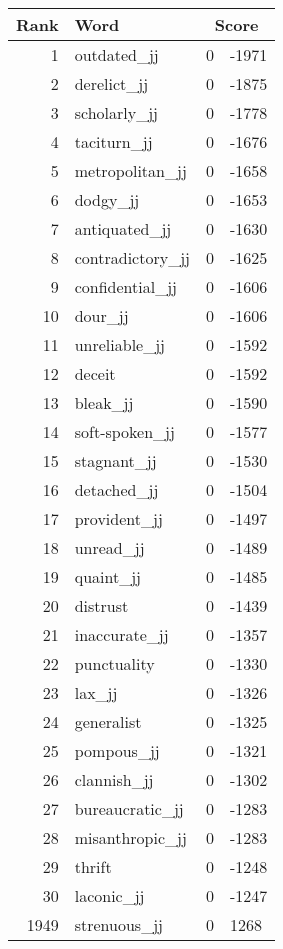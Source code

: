 \begin{longtable}[!htbp]{| rlr@{.}l |}
    \hline
    \textbf{Rank} & \textbf{Word} & \multicolumn{2}{c|}{\textbf{Score}} \\
    \hline
    \endhead
    1 & outdated\_jj & 0 & -1971 \\
    2 & derelict\_jj & 0 & -1875 \\
    3 & scholarly\_jj & 0 & -1778 \\
    4 & taciturn\_jj & 0 & -1676 \\
    5 & metropolitan\_jj & 0 & -1658 \\
    6 & dodgy\_jj & 0 & -1653 \\
    7 & antiquated\_jj & 0 & -1630 \\
    8 & contradictory\_jj & 0 & -1625 \\
    9 & confidential\_jj & 0 & -1606 \\
    10 & dour\_jj & 0 & -1606 \\
    11 & unreliable\_jj & 0 & -1592 \\
    12 & deceit & 0 & -1592 \\
    13 & bleak\_jj & 0 & -1590 \\
    14 & soft-spoken\_jj & 0 & -1577 \\
    15 & stagnant\_jj & 0 & -1530 \\
    16 & detached\_jj & 0 & -1504 \\
    17 & provident\_jj & 0 & -1497 \\
    18 & unread\_jj & 0 & -1489 \\
    19 & quaint\_jj & 0 & -1485 \\
    20 & distrust & 0 & -1439 \\
    21 & inaccurate\_jj & 0 & -1357 \\
    22 & punctuality & 0 & -1330 \\
    23 & lax\_jj & 0 & -1326 \\
    24 & generalist & 0 & -1325 \\
    25 & pompous\_jj & 0 & -1321 \\
    26 & clannish\_jj & 0 & -1302 \\
    27 & bureaucratic\_jj & 0 & -1283 \\
    28 & misanthropic\_jj & 0 & -1283 \\
    29 & thrift & 0 & -1248 \\
    30 & laconic\_jj & 0 & -1247 \\
    1949 & strenuous\_jj & 0 & 1268 \\

\end{longtable}
